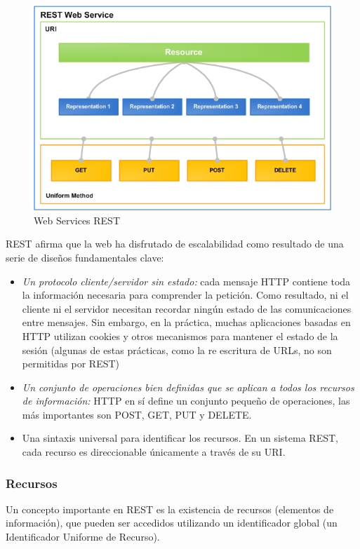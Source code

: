\begin{figure}[htbp]
  \centering
    \includegraphics[width=1\textwidth]{imagenes/REST.jpg}
     \caption{Web Services REST}
    \label{fig:REST}
\end{figure}

REST afirma que la web ha disfrutado de escalabilidad como resultado de una serie de diseños fundamentales clave:

\begin{itemize}
    \item \emph{Un protocolo cliente/servidor sin estado:} cada mensaje HTTP contiene toda la información necesaria para comprender la petición. Como resultado, ni el cliente ni el servidor necesitan recordar ningún estado de las comunicaciones entre mensajes. Sin embargo, en la práctica, muchas aplicaciones basadas en HTTP utilizan cookies y otros mecanismos para mantener el estado de la sesión (algunas de estas prácticas, como la re escritura de URLs, no son permitidas por REST)
    
    \item \emph{Un conjunto de operaciones bien definidas que se aplican a todos los recursos de información:} HTTP en sí define un conjunto pequeño de operaciones, las más importantes son POST, GET, PUT y DELETE.
    
    \item Una sintaxis universal para identificar los recursos. En un sistema REST, cada recurso es direccionable únicamente a través de su \gls{URI}.
   
 \end{itemize}
 
 \subsubsection{Recursos}
 Un concepto importante en REST es la existencia de recursos (elementos de información), que pueden ser accedidos utilizando un identificador global (un Identificador Uniforme de Recurso).
 
